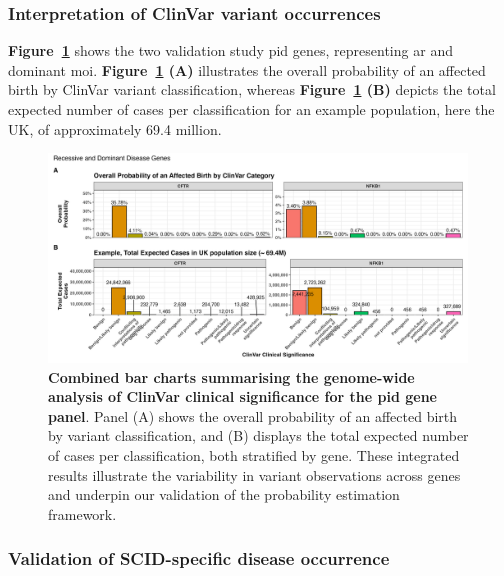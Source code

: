 \FloatBarrier
\subsubsection{Interpretation of ClinVar variant occurrences}

\textbf{Figure~\ref{fig:all_genes_combined_bar_charts_mini}} shows  the two validation study \ac{pid} genes, representing \ac{ar} and dominant \ac{moi}. \textbf{Figure~\ref{fig:all_genes_combined_bar_charts_mini} (A)}   illustrates the overall probability of an affected birth by ClinVar variant classification, whereas \textbf{Figure~\ref{fig:all_genes_combined_bar_charts_mini}  (B)}  depicts the total expected number of cases per classification for an example population, here the UK, of approximately 69.4 million. 

\begin{figure}[h]
  \centering
  \includegraphics[width=0.99\textwidth]{../images/all_genes_combined_bar_charts_mini.png}
  \caption{\textbf{Combined bar charts summarising the genome-wide analysis of ClinVar clinical significance for the \ac{pid} gene panel}. Panel (A) shows the overall probability of an affected birth by variant classification, and (B) displays the total expected number of cases per classification, both stratified by gene. These integrated results illustrate the variability in variant observations across genes and underpin our validation of the probability estimation framework.}
  \label{fig:all_genes_combined_bar_charts_mini}
\end{figure}

\FloatBarrier
\subsubsection{Validation of SCID-specific disease occurrence}

